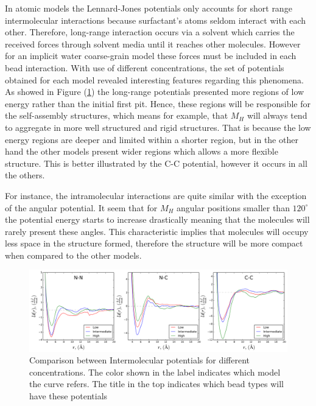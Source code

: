 \documentclass[10pt,a4paper,twoside]{article}
\begin{document}
In atomic models the Lennard-Jones potentials  only accounts for short range intermolecular interactions because surfactant's atoms seldom interact with each other. Therefore, long-range interaction occurs via a solvent which carries the received forces through solvent media until it reaches other molecules. However for an implicit water coarse-grain model these forces must be included in each bead interaction. With use of different concentrations, the set of potentials obtained for each model revealed interesting features regarding this phenomena. As showed in Figure (\ref{Fig:PotCompInter}) the long-range potentials presented more regions of low energy rather than the initial first pit. Hence, these regions will be responsible for the self-assembly structures, which means for example, that $M_H$ will always tend to aggregate in more well structured and rigid structures. That is because the low energy regions are deeper and limited within a shorter region, but in the other hand the other models present wider regions which allows a more flexible structure. This is better illustrated by the C-C potential, however it occurs in all the others.


For instance, the intramolecular interactions are quite similar with the exception of the angular potential. It seem that for $M_H$ angular positions smaller than $120^{\circ}$ the potential energy starts to increase drastically meaning that the molecules will rarely present these angles. This characteristic implies that molecules will occupy less space in the structure formed, therefore the structure  will be more compact when compared to the other models.

\begin{figure}[H]
  \begin{center}
	\includegraphics[width=1 \textwidth]{./graphs/PotCompInter}
	\caption{Comparison between Intermolecular potentials for different concentrations. The color shown in the label indicates which model the curve refers. The title in the top indicates which bead types will have these potentials}
	\label{Fig:PotCompInter}
  \end{center}
\end{figure} 
\end{document}

